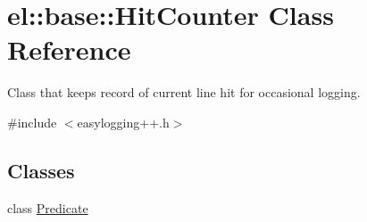\hypertarget{classel_1_1base_1_1HitCounter}{\section{el\-:\-:base\-:\-:Hit\-Counter Class Reference}
\label{classel_1_1base_1_1HitCounter}
}


Class that keeps record of current line hit for occasional logging.  




{\ttfamily \#include $<$easylogging++.\-h$>$}

\subsection*{Classes}
\begin{DoxyCompactItemize}
\item 
class \hyperlink{classel_1_1base_1_1HitCounter_1_1Predicate}{Predicate}
\end{DoxyCompactItemize}
